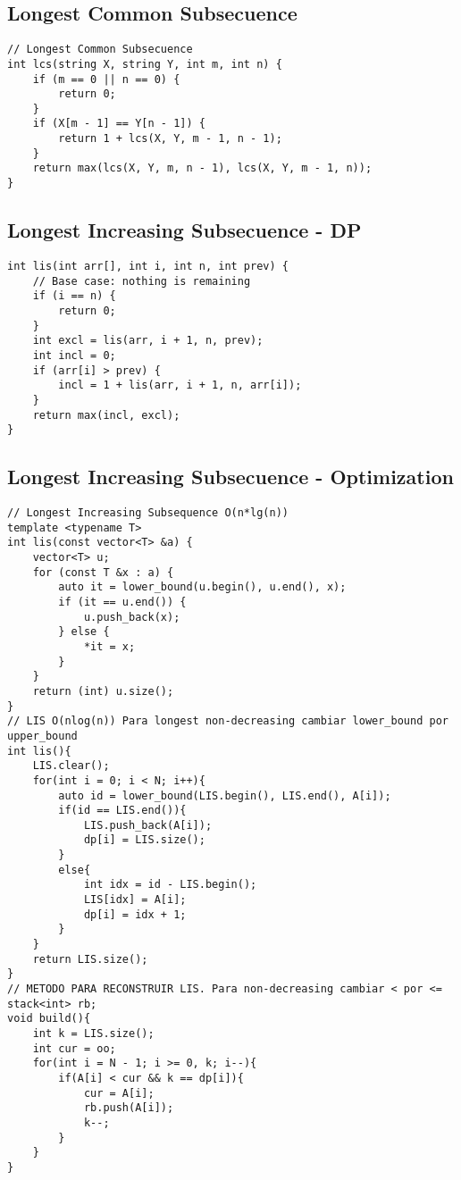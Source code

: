 \documentclass[10pt,letterpaper,twocolumn,twosided]{article}
\begin{document}
\subsection{Longest Common Subsecuence}
\begin{lstlisting}
// Longest Common Subsecuence
int lcs(string X, string Y, int m, int n) {
    if (m == 0 || n == 0) {
        return 0;
    }
    if (X[m - 1] == Y[n - 1]) {
        return 1 + lcs(X, Y, m - 1, n - 1);
    }
    return max(lcs(X, Y, m, n - 1), lcs(X, Y, m - 1, n));
}
\end{lstlisting}

\subsection{Longest Increasing Subsecuence - DP}
\begin{lstlisting}
int lis(int arr[], int i, int n, int prev) {
    // Base case: nothing is remaining
    if (i == n) {
        return 0;
    }
    int excl = lis(arr, i + 1, n, prev); 
    int incl = 0;
    if (arr[i] > prev) {
        incl = 1 + lis(arr, i + 1, n, arr[i]);
    }
    return max(incl, excl);
}
\end{lstlisting}

\subsection{Longest Increasing Subsecuence - Optimization}
\begin{lstlisting}
// Longest Increasing Subsequence O(n*lg(n))
template <typename T>
int lis(const vector<T> &a) {
    vector<T> u;
    for (const T &x : a) {
        auto it = lower_bound(u.begin(), u.end(), x);
        if (it == u.end()) {
            u.push_back(x);
        } else {
            *it = x;
        }
    }
    return (int) u.size();
}
// LIS O(nlog(n)) Para longest non-decreasing cambiar lower_bound por upper_bound
int lis(){
    LIS.clear();
    for(int i = 0; i < N; i++){
        auto id = lower_bound(LIS.begin(), LIS.end(), A[i]);
        if(id == LIS.end()){
            LIS.push_back(A[i]);
            dp[i] = LIS.size();
        } 
        else{
            int idx = id - LIS.begin();
            LIS[idx] = A[i];
            dp[i] = idx + 1;
        }
    }
    return LIS.size();
}
// METODO PARA RECONSTRUIR LIS. Para non-decreasing cambiar < por <=
stack<int> rb;
void build(){
    int k = LIS.size();
    int cur = oo;
    for(int i = N - 1; i >= 0, k; i--){
        if(A[i] < cur && k == dp[i]){
            cur = A[i];
            rb.push(A[i]);
            k--;
        }
    }
}
\end{lstlisting}
\end{document}
